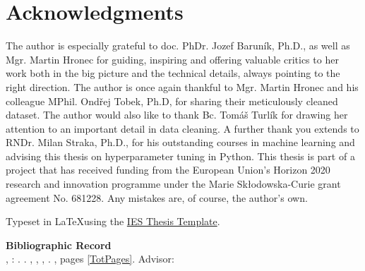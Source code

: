 \section*{Acknowledgments}
The author is especially grateful to doc. PhDr. Jozef Barun\'{i}k, Ph.D., as well as Mgr. Martin Hronec for guiding, inspiring and offering valuable critics to her work both in the big picture and the technical details, always pointing to the right direction. The author is once again thankful to Mgr. Martin Hronec and his colleague MPhil. Ond\v{r}ej Tobek, Ph.D, for sharing their meticulously cleaned dataset. The author would also like to thank Bc. Tom\'{a}\v{s} Turl\'{i}k for drawing her attention to an important detail in data cleaning. A further thank you extends to RNDr. Milan Straka, Ph.D., for his outstanding courses in machine learning and advising this thesis on hyperparameter tuning in Python. This thesis is part of a project that has received funding from the European Union’s Horizon 2020 research and innovation programme under the Marie Skłodowska-Curie grant agreement No. 681228. Any mistakes are, of course, the author's own. 


\vfill

\noindent Typeset in \LaTeX  using the \href{https://is.cuni.cz/studium/eng/predmety/index.php?do=predmet&kod=JEM001}{IES Thesis Template}. 

\bigskip

\noindent \textbf{Bibliographic Record} \\
\LastNameDP, \FirstNameDP: \emph{\Bookname}. \BookName. \CUNI, \FSS, \IES, \Place. \Year, pages \ref*{TotPages}. Advisor: \Supervisor


